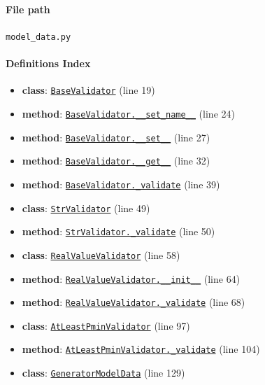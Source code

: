\documentclass[11pt]{report}
\begin{document}
\paragraph{File path} \texttt{model\_data.py}
\paragraph{Definitions Index}
\begin{itemize}[leftmargin=*]
  \item \textbf{class}: \hyperref[def:model_data.py:BaseValidator:L19]{\texttt{BaseValidator}} (line 19)
  \item \textbf{method}: \hyperref[def:model_data.py:BaseValidator.__set_name__:L24]{\texttt{BaseValidator.\_\_set\_name\_\_}} (line 24)
  \item \textbf{method}: \hyperref[def:model_data.py:BaseValidator.__set__:L27]{\texttt{BaseValidator.\_\_set\_\_}} (line 27)
  \item \textbf{method}: \hyperref[def:model_data.py:BaseValidator.__get__:L32]{\texttt{BaseValidator.\_\_get\_\_}} (line 32)
  \item \textbf{method}: \hyperref[def:model_data.py:BaseValidator._validate:L39]{\texttt{BaseValidator.\_validate}} (line 39)
  \item \textbf{class}: \hyperref[def:model_data.py:StrValidator:L49]{\texttt{StrValidator}} (line 49)
  \item \textbf{method}: \hyperref[def:model_data.py:StrValidator._validate:L50]{\texttt{StrValidator.\_validate}} (line 50)
  \item \textbf{class}: \hyperref[def:model_data.py:RealValueValidator:L58]{\texttt{RealValueValidator}} (line 58)
  \item \textbf{method}: \hyperref[def:model_data.py:RealValueValidator.__init__:L64]{\texttt{RealValueValidator.\_\_init\_\_}} (line 64)
  \item \textbf{method}: \hyperref[def:model_data.py:RealValueValidator._validate:L68]{\texttt{RealValueValidator.\_validate}} (line 68)
  \item \textbf{class}: \hyperref[def:model_data.py:AtLeastPminValidator:L97]{\texttt{AtLeastPminValidator}} (line 97)
  \item \textbf{method}: \hyperref[def:model_data.py:AtLeastPminValidator._validate:L104]{\texttt{AtLeastPminValidator.\_validate}} (line 104)
  \item \textbf{class}: \hyperref[def:model_data.py:GeneratorModelData:L129]{\texttt{GeneratorModelData}} (line 129)

\end{itemize}
\end{document}
